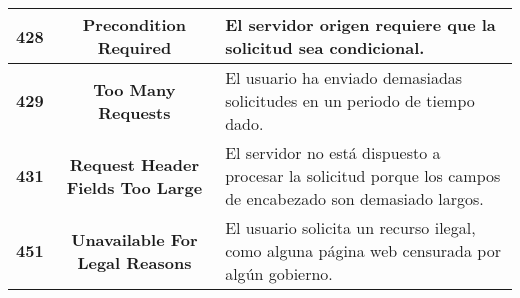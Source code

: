 \documentclass[10pt,a4paper]{article} %
\begin{document}
\begin{large}
\begin{longtable}[H]{ | c | c | p{8cm} |}
        \hline
        \textbf{428} & \textbf{Precondition Required} & El servidor origen requiere que la solicitud sea condicional. \\
        \hline
        \textbf{429} & \textbf{Too Many Requests} & El usuario ha enviado demasiadas solicitudes en un periodo de tiempo dado. \\
        \hline
        \textbf{431} & \textbf{Request Header Fields Too Large} & El servidor no est{\'a} dispuesto a procesar la solicitud porque los campos de encabezado son demasiado largos. \\
        \hline
        \textbf{451} & \textbf{Unavailable For Legal Reasons} & El usuario solicita un recurso ilegal, como alguna p{\'a}gina web censurada por alg{\'u}n gobierno. \\
        \hline
    \end{longtable}
\end{large}

\subsubsection{\color{colorESCOM}{Errores de los servidores (500 –- 599):}}
\end{document}
